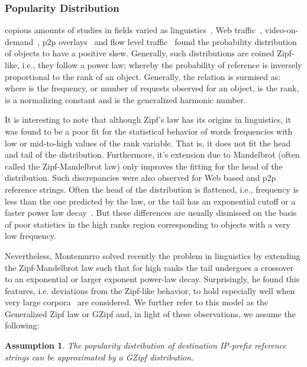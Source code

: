 \documentclass[twocolumn, 10pt]{article}
\theoremstyle{plain}
\newtheorem{assumption}{Assumption}
\begin{document}
\subsubsection{Popularity Distribution} copious amounts of studies in fields
varied as linguistics~\cite{zipf:principle_least_effort, montemurro:gzipf},
Web traffic~\cite{breslau:web_and_zipf,mahanti:web_proxy_hierarchy},
video-on-demand~\cite{cha:itube}, p2p overlays~\cite{dan:plaw} and flow level
traffic~\cite{sarrar:leverage_zipf} found the probability distribution of
objects to have a positive skew. Generally, such distributions are coined
Zipf-like, i.e., they follow a power law; whereby the probability
of reference is inversely proportional to the rank of an object. Generally,
the relation is surmised as: 
\noindent where  is the frequency, or number of requests observed for an
object,  is the rank,  is a normalizing constant and
 is the  generalized harmonic number. 

It is interesting to note that although Zipf's law has its origins in
linguistics, it was found to be a poor fit for the statistical behavior of
words frequencies with low or mid-to-high values of the rank variable. That
is, it does not fit the head and tail of the distribution.
Furthermore, it's extension due to Mandelbrot (often called the
Zipf-Mandelbrot law) only improves the fitting for the head of the
distribution.
Such discrepancies were also observed for Web based and p2p reference strings.
Often the head of the distribution is flattened, i.e., frequency is less than the
one predicted by the law, or the tail has an exponential cutoff or a faster
power law decay~\cite{montemurro:gzipf, dan:plaw}. But these differences are usually 
dismissed on the basis of poor statistics in the high ranks region
corresponding to objects with a very low frequency. 

Nevertheless, Montemurro solved recently the problem in linguistics by
extending the Zipf-Mandelbrot law such that for high ranks the tail
undergoes a crossover to an exponential or larger exponent power-law decay.
Surprisingly, he found this features, i.e. deviations from the Zipf-like
behavior, to hold especially well when very large
corpora~\cite{montemurro:gzipf} are considered. We further refer to this model
as the Generalized Zipf law or GZipf and, in light of these observations, we
assume the following: 


\begin{assumption}\label{prop:gzipf}
    The popularity distribution of destination IP-prefix reference strings can be
    approximated by a GZipf distribution.
\end{assumption}
\end{document}
